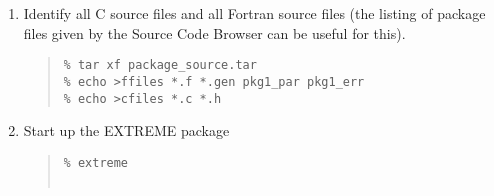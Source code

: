 \documentclass[twoside,11pt]{article}
\newcommand{\htmladdnormallink}[2]{#1}
\renewcommand{\_}{\texttt{\symbol{95}}}
\newenvironment{squote}{\begin{quote}\begin{small}}{\end{small}\end{quote}}
\begin{document}
\begin{enumerate}
%
\item
Identify all C source files and all Fortran source files
(the listing of package files given by the
\htmladdnormallink{Source Code
 Browser}{http://capc23.ast.cam.ac.uk/cgi-bin/scb}
can be useful for this).
\begin{squote}
\begin{verbatim}
% tar xf package_source.tar
% echo >ffiles *.f *.gen pkg1_par pkg1_err
% echo >cfiles *.c *.h
\end{verbatim}
\end{squote}
%
\item
Start up the EXTREME package
\begin{squote}
\begin{verbatim}
% extreme


\end{verbatim}
\end{squote}
\end{enumerate}
\end{document}
